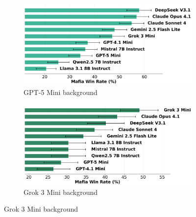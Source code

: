 \documentclass{article}
\begin{document}
\begin{figure}[htbp]
    \centering
    \begin{subfigure}[b]{0.48\textwidth}
        \centering
        \includegraphics[width=\textwidth]{../results/win_rates_deceive_gpt-41_mini.png}
        \caption{GPT-5 Mini background}
        \label{fig:mafioso_gpt5mini_appendix}
    \end{subfigure}
    \hfill
    \begin{subfigure}[b]{0.48\textwidth}
        \centering
        \includegraphics[width=\textwidth]{../results/win_rates_deceive_gpt-5_mini.png}
        \caption{Grok 3 Mini background}
        \label{fig:mafioso_grok3_appendix}
    \end{subfigure}
    
    \vspace{0.5cm}
    

\end{figure}
\end{document}
